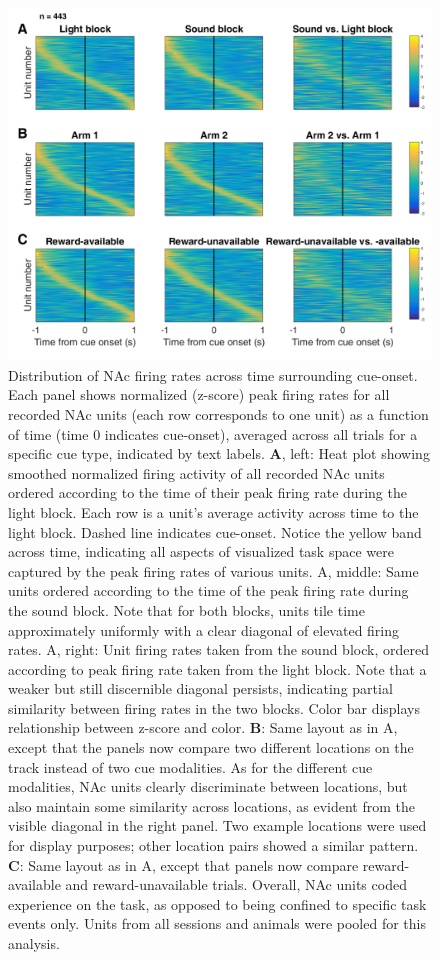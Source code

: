 \documentclass[11pt]{article}
\newcommand{\bsf}[1]{\textbf{#1}}
\begin{document}
 \begin{figure}[ht!]
\centering
\includegraphics[width=\textwidth]{Fig 5 - Task tiling.pdf}
\caption{Distribution of NAc firing rates across time surrounding cue-onset. Each panel shows normalized (z-score) peak firing rates for all recorded NAc
units (each row corresponds to one unit) as a function of time (time 0
indicates cue-onset), averaged across all trials for a specific cue type,
indicated by text labels. \bsf{A}, left: Heat plot showing smoothed normalized firing
activity of all recorded NAc units ordered according to the time of their peak
firing rate during the light block. Each row is a unit’s average activity
across time to the light block. Dashed line indicates cue-onset. Notice the
yellow band across time, indicating all aspects of visualized task space were
captured by the peak firing rates of various units. A, middle: Same units
ordered according to the time of the peak firing rate during the sound
block. Note that for both blocks, units tile time approximately uniformly with
a clear diagonal of elevated firing rates. A, right: Unit firing rates
taken from the sound block, ordered according to peak firing rate taken from
the light block. Note that a weaker but still discernible diagonal persists,
indicating partial similarity between firing rates in the two blocks. Color bar displays relationship between z-score and color. \bsf{B}: Same layout as in
A, except that the panels now compare two different locations on the track
instead of two cue modalities. As for the different cue modalities, NAc units
clearly discriminate between locations, but also maintain some similarity
across locations, as evident from the visible diagonal in the right panel. Two
example locations were used for display purposes; other location pairs showed
a similar pattern. \bsf{C}: Same layout as in A, except that panels now
compare reward-available and reward-unavailable trials. Overall, NAc units
coded experience on the task, as opposed to being confined to specific task
events only. Units from all sessions and animals were pooled for this
analysis.}
\label{fig:tiling}
\end{figure} \clearpage
\end{document}
